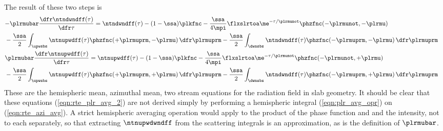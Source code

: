 \documentclass[12pt]{article}
\begin{document}
The result of these two steps is
\begin{subequations}
\label{eqn:rte_plr_avg_2}
\begin{align}
\label{eqn:rte_plr_avg_2_dwn}
\lefteqn{ - \plrmubar \frac{\dfr\ntndwndff(\tau)}{\dfr\tau} = 
\ntndwndff(\tau) - (1-\ssa) \plkfnc - 
\frac{\ssa}{4\mpi} \flxslrtoa \me^{-\tau/\plrmunot}
\phzfnc(-\plrmunot,-\plrmu) }
\nonumber \\ & {} %
- \frac{\ssa}{2} \int_{\upwsbs} \ntnupwdff(\tau) 
\phzfnc(+\plrmuprm,-\plrmu) \,\dfr\plrmuprm
- \frac{\ssa}{2} \int_{\dwnsbs} \ntndwndff(\tau) 
\phzfnc(-\plrmuprm,-\plrmu) \,\dfr\plrmuprm \\
\label{eqn:rte_plr_avg_2_upw}
\lefteqn{ \plrmubar \frac{\dfr\ntnupwdff(\tau)}{\dfr\tau} =  
\ntnupwdff(\tau) - (1-\ssa) \plkfnc -
\frac{\ssa}{4\mpi} \flxslrtoa \me^{-\tau/\plrmunot}
\phzfnc(-\plrmunot,+\plrmu) }
\nonumber \\ & {} %
- \frac{\ssa}{2} \int_{\upwsbs} \ntnupwdff(\tau) 
\phzfnc(+\plrmuprm,+\plrmu) \,\dfr\plrmuprm
- \frac{\ssa}{2} \int_{\dwnsbs} \ntndwndff(\tau) 
\phzfnc(-\plrmuprm,+\plrmu) \,\dfr\plrmuprm
\end{align}
\end{subequations} 
These are the hemispheric mean, azimuthal mean, two stream equations
for the radiation field in slab geometry. 
It should be clear that these equations (\ref{eqn:rte_plr_avg_2}) 
are not derived simply by performing a hemispheric integral
(\ref{eqn:plr_avg_opr}) on (\ref{eqn:rte_azi_avg}). 
A strict hemispheric averaging operation would apply to the product
of the phase function and and the intensity, not to each separately,
so that extracting $\ntnupwdwndff$ from the scattering integrals is an
approximation, as is the definition of $\plrmubar$.
\end{document}
